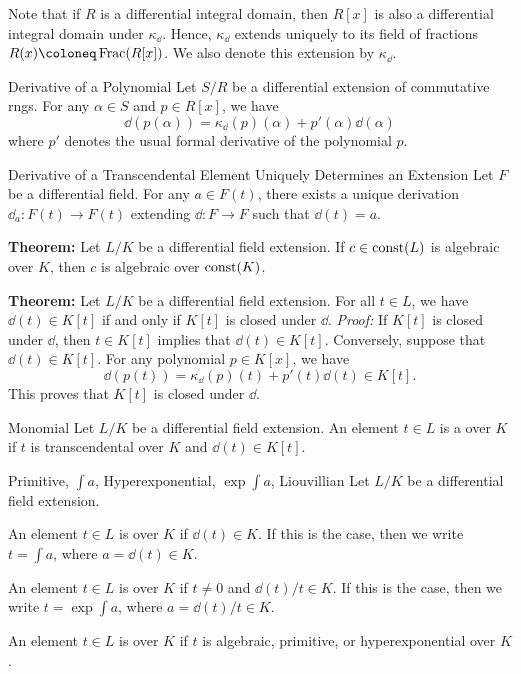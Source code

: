 Note that if $R$ is a differential integral domain, then $R[x]$ is also a differential integral domain under $\kappa_\dd$. Hence, $\kappa_\dd$ extends uniquely to its field of fractions $R(x) \coloneq \Frac(R[x])$. We also denote this extension by $\kappa_\dd$.

\begin{thmbox}{Derivative of a Polynomial}
	Let $S/R$ be a differential extension of commutative rngs. For any $\alpha \in S$ and $p \in R[x]$, we have
	\[ \dd(p(\alpha)) = \kappa_\dd(p)(\alpha) + p'(\alpha) \dd(\alpha) \]
	where $p'$ denotes the usual formal derivative of the polynomial $p$.
\end{thmbox}

\begin{thmbox}{Derivative of a Transcendental Element Uniquely Determines an Extension}
	Let $F$ be a differential field. For any $a \in F(t)$, there exists a unique derivation $\dd_a: F(t) \to F(t)$ extending $\dd: F \to F$ such that $\dd(t) = a$.
\end{thmbox}

\begin{thmbox}{}
	\textbf{Theorem:} Let $L/K$ be a differential field extension. If $c \in \operatorname{const}(L)$ is algebraic over $K$, then $c$ is algebraic over $\operatorname{const}(K)$.
\end{thmbox}

\begin{thmbox}{}
	\textbf{Theorem:} Let $L/K$ be a differential field extension. For all $t \in L$, we have $\dd(t) \in K[t]$ if and only if $K[t]$ is closed under $\dd$.
\tcblower
	\textit{Proof:} If $K[t]$ is closed under $\dd$, then $t \in K[t]$ implies that $\dd(t) \in K[t]$. Conversely, suppose that $\dd(t) \in K[t]$. For any polynomial $p \in K[x]$, we have
	\[ \dd(p(t)) = \kappa_\dd(p)(t) + p'(t) \dd(t) \in K[t]. \]
	This proves that $K[t]$ is closed under $\dd$.
\end{thmbox}

\begin{dfnbox}{Monomial}
	Let $L/K$ be a differential field extension. An element $t \in L$ is a  over $K$ if $t$ is transcendental over $K$ and $\dd(t) \in K[t]$.
\end{dfnbox}

\begin{dfnbox}{Primitive, $\int a$, Hyperexponential, $\exp \int a$, Liouvillian}
	Let $L/K$ be a differential field extension.
	\begin{dfnitems}
		\item An element $t \in L$ is  over $K$ if $\dd(t) \in K$. If this is the case, then we write $t = \int a$, where $a = \dd(t) \in K$.
		\item An element $t \in L$ is  over $K$ if $t \ne 0$ and $\dd(t)/t \in K$. If this is the case, then we write $t = \exp \int a$, where $a = \dd(t)/t \in K$.
		\item An element $t \in L$ is  over $K$ if $t$ is algebraic, primitive, or hyperexponential over $K$.
	\end{dfnitems}
\end{dfnbox}

